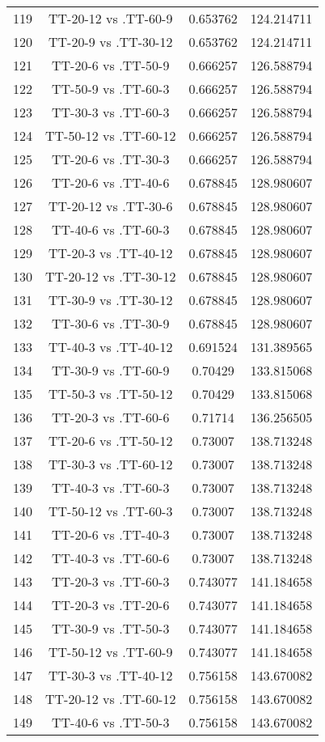 \documentclass[a4paper,10pt]{article}
\begin{document}
\begin{landscape}
\begin{table}[!htp]
\begin{tabular}{cccc}
119&TT-20-12 vs .TT-60-9&0.653762&124.214711\\
120&TT-20-9 vs .TT-30-12&0.653762&124.214711\\
121&TT-20-6 vs .TT-50-9&0.666257&126.588794\\
122&TT-50-9 vs .TT-60-3&0.666257&126.588794\\
123&TT-30-3 vs .TT-60-3&0.666257&126.588794\\
124&TT-50-12 vs .TT-60-12&0.666257&126.588794\\
125&TT-20-6 vs .TT-30-3&0.666257&126.588794\\
126&TT-20-6 vs .TT-40-6&0.678845&128.980607\\
127&TT-20-12 vs .TT-30-6&0.678845&128.980607\\
128&TT-40-6 vs .TT-60-3&0.678845&128.980607\\
129&TT-20-3 vs .TT-40-12&0.678845&128.980607\\
130&TT-20-12 vs .TT-30-12&0.678845&128.980607\\
131&TT-30-9 vs .TT-30-12&0.678845&128.980607\\
132&TT-30-6 vs .TT-30-9&0.678845&128.980607\\
133&TT-40-3 vs .TT-40-12&0.691524&131.389565\\
134&TT-30-9 vs .TT-60-9&0.70429&133.815068\\
135&TT-50-3 vs .TT-50-12&0.70429&133.815068\\
136&TT-20-3 vs .TT-60-6&0.71714&136.256505\\
137&TT-20-6 vs .TT-50-12&0.73007&138.713248\\
138&TT-30-3 vs .TT-60-12&0.73007&138.713248\\
139&TT-40-3 vs .TT-60-3&0.73007&138.713248\\
140&TT-50-12 vs .TT-60-3&0.73007&138.713248\\
141&TT-20-6 vs .TT-40-3&0.73007&138.713248\\
142&TT-40-3 vs .TT-60-6&0.73007&138.713248\\
143&TT-20-3 vs .TT-60-3&0.743077&141.184658\\
144&TT-20-3 vs .TT-20-6&0.743077&141.184658\\
145&TT-30-9 vs .TT-50-3&0.743077&141.184658\\
146&TT-50-12 vs .TT-60-9&0.743077&141.184658\\
147&TT-30-3 vs .TT-40-12&0.756158&143.670082\\
148&TT-20-12 vs .TT-60-12&0.756158&143.670082\\
149&TT-40-6 vs .TT-50-3&0.756158&143.670082\\

\end{tabular}
\end{table}
\end{landscape}
\end{document}
